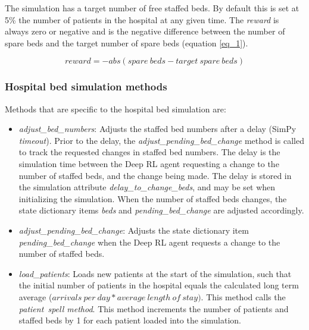 \documentclass{article}
\begin{document}
\begin{multicols}{2}
The simulation has a target number of free staffed beds. By default this is set at 5\% the number of patients in the hospital at any given time. The \emph{reward} is always zero or negative and is the negative difference between the number of spare beds and the target number of spare beds (equation \ref{eq_1}).

\begin{small}
\begin{equation}
    reward = -abs(spare\ beds-target\ spare\ beds)
\label{eq_1}
\end{equation}
\end{small}

\subsubsection{Hospital bed simulation methods}

Methods that are specific to the hospital bed simulation are:

\begin{itemize}
    \item \emph{adjust\_bed\_numbers}: Adjusts the staffed bed numbers after a delay (SimPy \emph{timeout}). Prior to the delay, the \emph{adjust\_pending\_bed\_change} method is called to track the requested changes in staffed bed numbers. The delay is the simulation time between the Deep RL agent requesting a change to the number of staffed beds, and the change being made. The delay is stored in the simulation attribute \emph{delay\_to\_change\_beds}, and may be set when initializing the simulation. When the number of staffed beds changes, the state dictionary items \emph{beds} and \emph{pending\_bed\_change} are adjusted accordingly.
    
    \item \emph{adjust\_pending\_bed\_change}: Adjusts the state dictionary item \emph{pending\_bed\_change} when the Deep RL agent requests a change to the number of staffed beds. 
    
    \item \emph{load\_patients}: Loads new patients at the start of the simulation, such that the initial number of patients in the hospital equals the calculated long term average ($arrivals\ per\ day * average\ length\ of\ stay)$. This method calls the \emph{patient\ spell method}. This method increments the number of patients and staffed beds by 1 for each patient loaded into the simulation.
    

\end{itemize}
\end{multicols}
\end{document}
